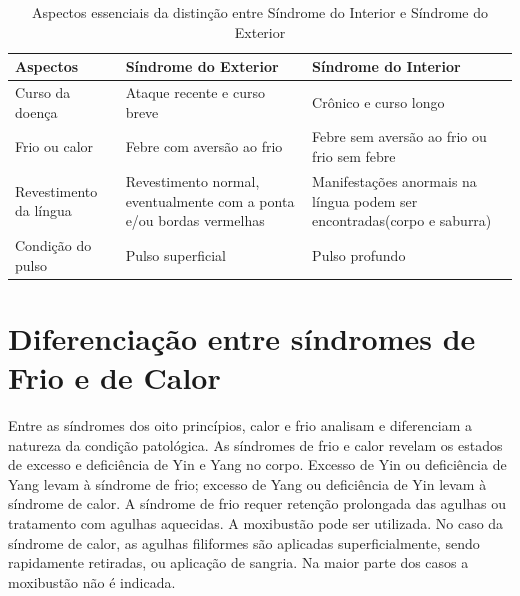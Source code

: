 \documentclass[12pt,oneside,a4paper]{book} %
\begin{document}
\begin{table}[!h]

\centering
{\renewcommand\arraystretch{1.25}
	\caption{ Aspectos essenciais da distinção entre Síndrome do Interior e Síndrome do Exterior}}

	\begin{tabular}{l p{5.5cm} p{5.5cm}}
	
		\hline
		
		 Aspectos &  
		 Síndrome do Exterior &
		 Síndrome do Interior				
		\\ \hline \hline
		  
		Curso da doença &
		Ataque recente e curso breve &
		 Crônico e curso longo
		\\  
		  
		Frio ou calor &
		Febre com aversão ao frio &
	    Febre sem aversão ao frio ou frio sem febre
		\\  
		  
		 Revestimento da língua &
		Revestimento normal, eventualmente com a ponta e/ou bordas vermelhas &
		Manifestações anormais na língua podem ser encontradas(corpo e saburra)
		\\  
		  
		Condição do pulso &
		Pulso superficial &
		{Pulso profundo}
		\\  
		\hline
		
  \end{tabular} 


\end{table} 


\section{Diferenciação entre síndromes de Frio e de Calor}

Entre as síndromes dos oito princípios, calor e frio analisam e diferenciam a natureza da condição patológica. As síndromes de frio e calor revelam os estados de excesso e deficiência de Yin e Yang no corpo. Excesso de Yin ou deficiência de Yang levam à síndrome de frio; excesso de Yang ou deficiência de Yin levam à síndrome de calor. 
A síndrome de frio requer retenção prolongada das agulhas ou tratamento com agulhas aquecidas. A moxibustão pode ser utilizada. 
No caso da síndrome de calor, as agulhas filiformes são aplicadas superficialmente, sendo rapidamente retiradas, ou aplicação de sangria. Na maior parte dos casos a moxibustão não é indicada.
\end{document}

